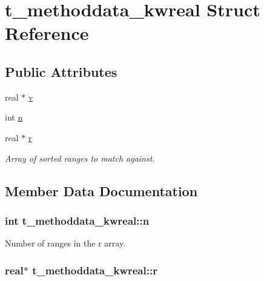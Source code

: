 \hypertarget{structt__methoddata__kwreal}{\section{t\-\_\-methoddata\-\_\-kwreal \-Struct \-Reference}
\label{structt__methoddata__kwreal}
}
\subsection*{\-Public \-Attributes}
\begin{DoxyCompactItemize}
\item 
real $\ast$ \hyperlink{structt__methoddata__kwreal_a2075d40476fabf10b1ec5569d9cf744a}{v}
\item 
int \hyperlink{structt__methoddata__kwreal_a594d279d2fac93ac21d68047723a6c7b}{n}
\item 
real $\ast$ \hyperlink{structt__methoddata__kwreal_a706e2e3fed6d01d17526f5048cff8b2c}{r}
\begin{DoxyCompactList}\small\item\em \-Array of sorted ranges to match against. \end{DoxyCompactList}\end{DoxyCompactItemize}


\subsection{\-Member \-Data \-Documentation}
\hypertarget{structt__methoddata__kwreal_a594d279d2fac93ac21d68047723a6c7b}{
\subsubsection[{n}]{\setlength{\rightskip}{0pt plus 5cm}int {\bf t\-\_\-methoddata\-\_\-kwreal\-::n}}}\label{structt__methoddata__kwreal_a594d279d2fac93ac21d68047723a6c7b}
\-Number of ranges in the {\ttfamily r} array. \hypertarget{structt__methoddata__kwreal_a706e2e3fed6d01d17526f5048cff8b2c}{
\subsubsection[{r}]{\setlength{\rightskip}{0pt plus 5cm}real$\ast$ {\bf t\-\_\-methoddata\-\_\-kwreal\-::r}}}\label{structt__methoddata__kwreal_a706e2e3fed6d01d17526f5048cff8b2c}


